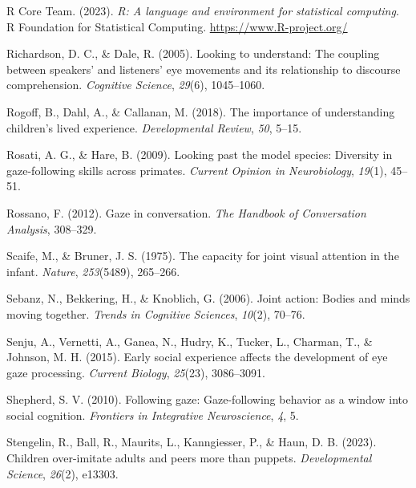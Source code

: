 \documentclass[
  man,floatsintext]{apa7}
\newlength{\cslhangindent}
\newlength{\cslentryspacingunit} %
\newenvironment{CSLReferences}[2] %
 {%
  \setlength{\parindent}{0pt}
  \ifodd #1
  \let\oldpar\par
  \def\par{\hangindent=\cslhangindent\oldpar}
  \fi
  \setlength{\parskip}{#2\cslentryspacingunit}
 }%
 {}
\begin{document}
\begin{CSLReferences}{1}{0}
\leavevmode{}%
R Core Team. (2023). \emph{R: A language and environment for statistical computing}. R Foundation for Statistical Computing. \url{https://www.R-project.org/}

\leavevmode{}%
Richardson, D. C., \& Dale, R. (2005). Looking to understand: The coupling between speakers' and listeners' eye movements and its relationship to discourse comprehension. \emph{Cognitive Science}, \emph{29}(6), 1045--1060.

\leavevmode{}%
Rogoff, B., Dahl, A., \& Callanan, M. (2018). The importance of understanding children's lived experience. \emph{Developmental Review}, \emph{50}, 5--15.

\leavevmode{}%
Rosati, A. G., \& Hare, B. (2009). Looking past the model species: Diversity in gaze-following skills across primates. \emph{Current Opinion in Neurobiology}, \emph{19}(1), 45--51.

\leavevmode{}%
Rossano, F. (2012). Gaze in conversation. \emph{The Handbook of Conversation Analysis}, 308--329.

\leavevmode{}%
Scaife, M., \& Bruner, J. S. (1975). The capacity for joint visual attention in the infant. \emph{Nature}, \emph{253}(5489), 265--266.

\leavevmode{}%
Sebanz, N., Bekkering, H., \& Knoblich, G. (2006). Joint action: Bodies and minds moving together. \emph{Trends in Cognitive Sciences}, \emph{10}(2), 70--76.

\leavevmode{}%
Senju, A., Vernetti, A., Ganea, N., Hudry, K., Tucker, L., Charman, T., \& Johnson, M. H. (2015). Early social experience affects the development of eye gaze processing. \emph{Current Biology}, \emph{25}(23), 3086--3091.

\leavevmode{}%
Shepherd, S. V. (2010). Following gaze: Gaze-following behavior as a window into social cognition. \emph{Frontiers in Integrative Neuroscience}, \emph{4}, 5.

\leavevmode{}%
Stengelin, R., Ball, R., Maurits, L., Kanngiesser, P., \& Haun, D. B. (2023). Children over-imitate adults and peers more than puppets. \emph{Developmental Science}, \emph{26}(2), e13303.


\end{CSLReferences}
\end{document}
